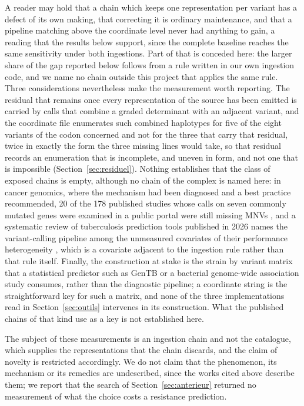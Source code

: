 \documentclass[11pt]{article}
\begin{document}
A reader may hold that a chain which keeps one representation
per variant has a defect of its own making, that correcting it is ordinary maintenance,
and that a pipeline matching above the coordinate level never had anything to gain, a
reading that the results below support, since the complete baseline reaches the same
sensitivity under both ingestions. Part of that is conceded here: the larger
share of the gap reported below follows from a rule written in our own ingestion code, and
we name no chain outside this project that applies the same rule. Three considerations
nevertheless make the measurement worth reporting. The residual that remains once every
representation of the source has been emitted is carried by calls that combine a graded
determinant with an adjacent variant, and the coordinate file enumerates such combined
haplotypes for five of the eight variants of the codon concerned and not for the three that
carry that residual, twice in exactly the form the three missing lines would take, so that
residual records an enumeration that is incomplete, and uneven in form, and not one that is
impossible (Section~\ref{sec:residuel}). Nothing establishes that the class of exposed chains is
empty, although no chain of the complex is named here: in cancer genomics, where the
mechanism had been diagnosed and a best practice recommended, 20 of the 178 published
studies whose calls on seven commonly mutated genes were examined in a public portal were
still missing MNVs \cite{srinivasan2021}, and a systematic review of tuberculosis
prediction tools published in 2026 names the variant-calling pipeline among the unmeasured
covariates of their performance heterogeneity \cite{peng2026}, which is a covariate
adjacent to the ingestion rule rather than that rule itself. Finally, the construction at
stake is the strain by variant matrix that a statistical predictor such as GenTB
\cite{groschel2021} or a bacterial genome-wide association study consumes, rather than the
diagnostic pipeline; a coordinate string is the straightforward key for such a matrix, and
none of the three implementations read in Section~\ref{sec:outils} intervenes in its
construction. What the published chains of that kind use as a key is not established here.

The subject of these measurements is an ingestion chain and not the catalogue, which supplies
the representations that the chain discards, and the claim of novelty is restricted
accordingly. We do not claim that the phenomenon, its mechanism or its remedies are
undescribed, since the works cited above describe them; we report that the search of
Section~\ref{sec:anterieur} returned no measurement of what the choice costs a resistance
prediction.
\end{document}
